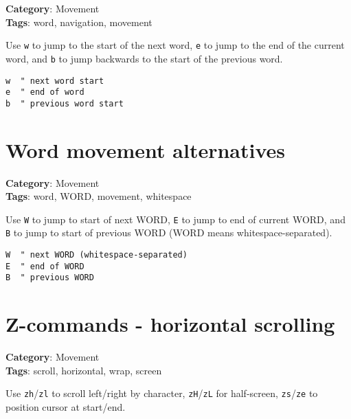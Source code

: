 {{{{{{{{\textbf{Category}: Movement\\ \textbf{Tags}: word, navigation, movement
\vspace{0.5cm}

Use {\footnotesize \Verb§w§} to jump to the start of the next word, {\footnotesize \Verb§e§} to jump to the end of the current word, and {\footnotesize \Verb§b§} to jump backwards to the start of the previous word.

\begin{Exa*}{}
\begin{Verbatim}[fontsize=\footnotesize, breaklines, breakanywhere]
w  " next word start
e  " end of word
b  " previous word start
\end{Verbatim}
\end{Exa*}

\section{Word movement alternatives}

\textbf{Category}: Movement\\ \textbf{Tags}: word, WORD, movement, whitespace
\vspace{0.5cm}

Use {\footnotesize \Verb§W§} to jump to start of next WORD, {\footnotesize \Verb§E§} to jump to end of current WORD, and {\footnotesize \Verb§B§} to jump to start of previous WORD (WORD means whitespace-separated).

\begin{Exa*}{}
\begin{Verbatim}[fontsize=\footnotesize, breaklines, breakanywhere]
W  " next WORD (whitespace-separated)
E  " end of WORD
B  " previous WORD
\end{Verbatim}
\end{Exa*}

\section{Z-commands - horizontal scrolling}

\textbf{Category}: Movement\\ \textbf{Tags}: scroll, horizontal, wrap, screen
\vspace{0.5cm}

Use {\footnotesize \Verb§zh§}/{\footnotesize \Verb§zl§} to scroll left/right by character, {\footnotesize \Verb§zH§}/{\footnotesize \Verb§zL§} for half-screen, {\footnotesize \Verb§zs§}/{\footnotesize \Verb§ze§} to position cursor at start/end.

}}}}}}}}
